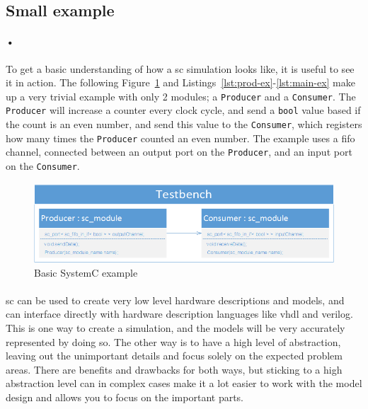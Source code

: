 \documentclass[a4paper]{report}
\newcommand{\codeword}[1]{\texttt{#1}}
\begin{document}
{\newpage
\subsection{Small example}

\paragraph{•}
To get a basic understanding of how a \gls{sc} simulation looks like, it is useful to see it in action.
The following Figure~\ref{fig:sc-ex} and Listings~\ref{lst:prod-ex}-\ref{lst:main-ex} make up a very trivial example with only 2 modules; a \codeword{Producer} and a \codeword{Consumer}.
The \codeword{Producer} will increase a counter every clock cycle, and send a \codeword{bool} value based if the count is an even number, and send this value to the \codeword{Consumer}, which registers how many times the \codeword{Producer} counted an even number.
The example uses a \gls{fifo} channel, connected between an output port on the \codeword{Producer}, and an input port on the \codeword{Consumer}.

\begin{figure}[h!]
  \centering
    \includegraphics[width=1.0\textwidth]{images/sc-example.png}
     \caption{Basic SystemC example}
    \label{fig:sc-ex}
\end{figure}

\noindent
\begin{minipage}{\linewidth}

\end{minipage}
\begin{minipage}{\linewidth}

\end{minipage}
\begin{minipage}{\linewidth}

\end{minipage}

\paragraph{}
\gls{sc} can be used to create very low level hardware descriptions and models, and can interface directly with hardware description languages like \gls{vhdl} and \gls{verilog}.
This is one way to create a simulation, and the models will be very accurately represented by doing so.
The other way is to have a high level of abstraction, leaving out the unimportant details and focus solely on the expected problem areas.
There are benefits and drawbacks for both ways, but sticking to a high abstraction level can in complex cases make it a lot easier to work with the model design and allows you to focus on the important parts.
}
\end{document}
